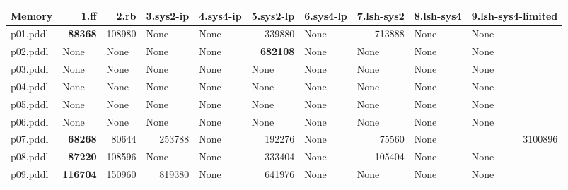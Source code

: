 \documentclass{article}
\begin{document}
\begin{tabular}{@{}lrrrrrrrrr@{}}
Memory & 1.ff & 2.rb & 3.sys2-ip & 4.sys4-ip & 5.sys2-lp & 6.sys4-lp & 7.lsh-sys2 & 8.lsh-sys4 & 9.lsh-sys4-limited \\
\midrule
p01.pddl & \textbf{88368} & 108980 & \multicolumn{1}{|l|}{None} & \multicolumn{1}{|l|}{None} & 339880 & \multicolumn{1}{|l|}{None} & 713888 & \multicolumn{1}{|l|}{None} & \multicolumn{1}{|l|}{None} \\
p02.pddl & \multicolumn{1}{|l|}{None} & \multicolumn{1}{|l|}{None} & \multicolumn{1}{|l|}{None} & \multicolumn{1}{|l|}{None} & \textbf{682108} & \multicolumn{1}{|l|}{None} & \multicolumn{1}{|l|}{None} & \multicolumn{1}{|l|}{None} & \multicolumn{1}{|l|}{None} \\
p03.pddl & \multicolumn{1}{|l|}{None} & \multicolumn{1}{|l|}{None} & \multicolumn{1}{|l|}{None} & \multicolumn{1}{|l|}{None} & \multicolumn{1}{|l|}{None} & \multicolumn{1}{|l|}{None} & \multicolumn{1}{|l|}{None} & \multicolumn{1}{|l|}{None} & \multicolumn{1}{|l|}{None} \\
p04.pddl & \multicolumn{1}{|l|}{None} & \multicolumn{1}{|l|}{None} & \multicolumn{1}{|l|}{None} & \multicolumn{1}{|l|}{None} & \multicolumn{1}{|l|}{None} & \multicolumn{1}{|l|}{None} & \multicolumn{1}{|l|}{None} & \multicolumn{1}{|l|}{None} & \multicolumn{1}{|l|}{None} \\
p05.pddl & \multicolumn{1}{|l|}{None} & \multicolumn{1}{|l|}{None} & \multicolumn{1}{|l|}{None} & \multicolumn{1}{|l|}{None} & \multicolumn{1}{|l|}{None} & \multicolumn{1}{|l|}{None} & \multicolumn{1}{|l|}{None} & \multicolumn{1}{|l|}{None} & \multicolumn{1}{|l|}{None} \\
p06.pddl & \multicolumn{1}{|l|}{None} & \multicolumn{1}{|l|}{None} & \multicolumn{1}{|l|}{None} & \multicolumn{1}{|l|}{None} & \multicolumn{1}{|l|}{None} & \multicolumn{1}{|l|}{None} & \multicolumn{1}{|l|}{None} & \multicolumn{1}{|l|}{None} & \multicolumn{1}{|l|}{None} \\
p07.pddl & \textbf{68268} & 80644 & 253788 & \multicolumn{1}{|l|}{None} & 192276 & \multicolumn{1}{|l|}{None} & 75560 & \multicolumn{1}{|l|}{None} & 3100896 \\
p08.pddl & \textbf{87220} & 108596 & \multicolumn{1}{|l|}{None} & \multicolumn{1}{|l|}{None} & 333404 & \multicolumn{1}{|l|}{None} & 105404 & \multicolumn{1}{|l|}{None} & \multicolumn{1}{|l|}{None} \\
p09.pddl & \textbf{116704} & 150960 & 819380 & \multicolumn{1}{|l|}{None} & 641976 & \multicolumn{1}{|l|}{None} & \multicolumn{1}{|l|}{None} & \multicolumn{1}{|l|}{None} & \multicolumn{1}{|l|}{None} \\

\end{tabular}
\end{document}
